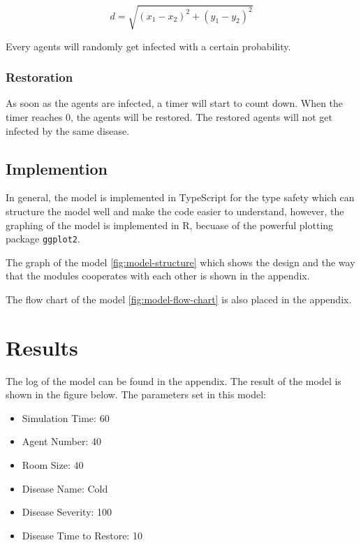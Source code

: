 \documentclass[12pt]{article}
\begin{document}
\[
d=\sqrt{(x_1-x_2)^2+(y_1-y_2)^2}
\]

Every agents will randomly get infected with a certain probability.

\subsubsection{Restoration}

As soon as the agents are infected, a timer will start to count down. When the timer reaches 0, the agents will be restored. The restored agents will not get infected by the same disease.

\subsection{Implemention}

In general, the model is implemented in TypeScript for the type safety which can structure the model well and make the code easier to understand, however, the graphing of the model is implemented in R, becuase of the powerful plotting package \texttt{ggplot2}.

The graph of the model \ref{fig:model-structure} which shows the design and the way that the modules cooperates with each other is shown in the appendix.

The flow chart of the model \ref{fig:model-flow-chart} is also placed in the appendix.

\section{Results}
The log of the model can be found in the appendix.
The result of the model is shown in the figure below. The parameters set in this model: 

\begin{itemize}
    \item Simulation Time: 60
    \item Agent Number: 40
    \item Room Size: 40
\end{itemize}


\begin{itemize}
	\item Disease Name: Cold
	\item Disease Severity: 100
	\item Disease Time to Restore: 10
\end{itemize}
\end{document}
